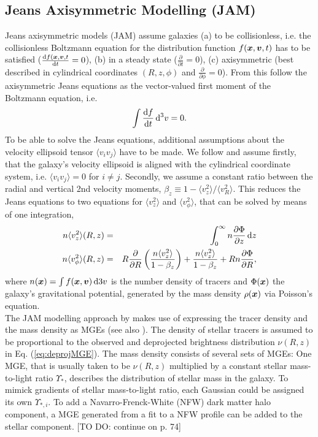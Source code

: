 \subsection{Jeans Axisymmetric Modelling (JAM)} \label{sec:model_JAM}

Jeans axisymmetric models (JAM) assume galaxies (a) to be collisionless, i.e. the collisionless Boltzmann equation for the distribution function $f(\boldsymbol{x},\boldsymbol{v},t)$ has to be satisfied ($\frac{\mathop{}\!\mathrm{d} f(\boldsymbol{x},\boldsymbol{v},t}{\mathop{}\!\mathrm{d} t} = 0$), (b) in a steady state ($\frac{\partial}{\partial t} = 0$), (c) axisymmetric (best described in cylindrical coordinates $(R,z,\phi)$ and $\frac{\partial}{\partial \phi} = 0$). From this follow the axisymmetric Jeans equations as the vector-valued first moment of the Boltzmann equation, i.e.
\begin{equation*}
\int \frac{\mathop{}\!\mathrm{d} f}{\mathop{}\!\mathrm{d} t} \mathop{}\!\mathrm{d^3} v = 0.
\end{equation*}
To be able to solve the Jeans equations, additional assumptions about the velocity ellipsoid tensor $\langle v_i v_j\rangle$ have to be made. We follow \citet{Cap08} and assume firstly, that the galaxy's velocity ellipsoid is aligned with the cylindrical coordinate system, i.e. $\langle v_i v_j\rangle = 0$ for $i\neq j$. Secondly, we assume a constant ratio between the radial and vertical 2nd velocity moments, $\beta_z \equiv 1 - \langle v_z^2 \rangle / \langle v_R^2\rangle$. This reduces the Jeans equations to two equations for $\langle v_z^2 \rangle$ and $\langle v_\phi^2 \rangle$, that can be solved by means of one integration,
\begin{eqnarray*}
n \langle v_z^2 \rangle (R,z) &=& \int_0^\infty n \frac{\partial \Phi}{\partial z} \mathop{}\!\mathrm{d} z\\
n \langle v_\phi^2 \rangle (R,z) &=& R \frac{\partial}{\partial R} \left( \frac{n \langle v_z^2 \rangle}{1-\beta_z} \right) + \frac{n \langle v_z^2 \rangle}{1 - \beta_z} + R n \frac{\partial \Phi}{\partial R},
\end{eqnarray*}
where $n(\boldsymbol{x}) = \int f(\boldsymbol{x},\boldsymbol{v}) \mathop{}\!\mathrm{d}3 v$ is the number density of tracers and $\Phi(\boldsymbol{x})$ the galaxy's gravitational potential, generated by the mass density $\rho(\boldsymbol{x})$ via Poisson's equation.
\\The JAM modelling approach by \citet{Cap08} makes use of expressing the tracer density and the mass density as MGEs (see also \citet{1994A&A...285..723E}). The density of stellar tracers is assumed to be proportional to the observed and deprojected brightness distribution $\nu(R,z)$ in Eq. (\ref{eq:deprojMGE}). The mass density consists of several sets of MGEs: One MGE, that is usually taken to be $\nu(R,z)$ multiplied by a constant stellar mass-to-light ratio $\Upsilon_*$, describes the distribution of stellar mass in the galaxy. To mimick gradients of stellar mass-to-light ratio, each Gaussian could be assigned its own $\Upsilon_{*,i}$. To add a Navarro-Frenck-White (NFW) \citep{Navarro+1995c,NFW96} dark matter halo component, a MGE generated from a fit to a NFW profile can be added to the stellar component. [TO DO: continue on p. 74] 


